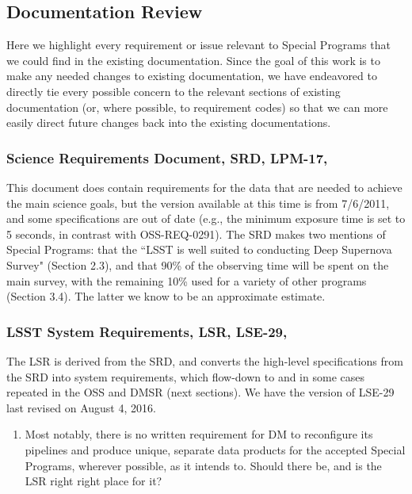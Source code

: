 \documentclass[DM,lsstdraft,toc]{lsstdoc}
\begin{document}
\subsection{Documentation Review}\label{ssec:dmplans_review}

Here we highlight every requirement or issue relevant to Special Programs that we could find in the existing documentation. Since the goal of this work is to make any needed changes to existing documentation, we have endeavored to directly tie every possible concern to the relevant sections of existing documentation (or, where possible, to requirement codes) so that we can more easily direct future changes back into the existing documentations.


\subsubsection{Science Requirements Document, SRD, LPM-17, \cite{LPM-17}}\label{sssec:dmplans_review_srd}

This document does contain requirements for the data that are needed to achieve the main science goals, but the version available at this time is from 7/6/2011, and some specifications are out of date (e.g., the minimum exposure time is set to 5 seconds, in contrast with OSS-REQ-0291). The SRD makes two mentions of Special Programs: that the ``LSST is well suited to conducting Deep Supernova Survey" (Section 2.3), and that 90\% of the observing time will be spent on the main survey, with the remaining 10\% used for a variety of other programs (Section 3.4). The latter we know to be an approximate estimate.


\subsubsection{LSST System Requirements, LSR, LSE-29, \cite{LSE-29}}\label{sssec:dmplans_review_lsr}

The LSR is derived from the SRD, and converts the high-level specifications from the SRD into system requirements, which flow-down to and in some cases repeated in the OSS and DMSR (next sections). We have the version of LSE-29 last revised on August 4, 2016.

\begin{enumerate}[topsep=-10pt,after=\vspace{10pt},label= \textbf{Concern \Roman*.},resume] \item \label{LSR-0} Most notably, there is no written requirement for DM to reconfigure its pipelines and produce unique, separate data products for the accepted Special Programs, wherever possible, as it intends to. Should there be, and is the LSR right right place for it? \end{enumerate}
\end{document}
